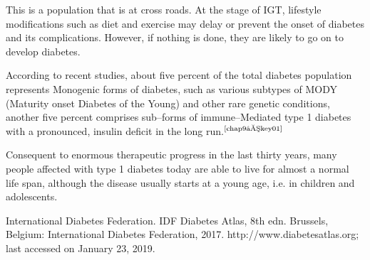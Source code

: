 This is a population that is at cross roads. At the stage of IGT, lifestyle modifications such as diet and exercise may delay or prevent the onset of diabetes and its complications. However, if nothing is done, they are likely to go on to develop diabetes.

According to recent studies, about five percent of the total diabetes population represents Monogenic forms of diabetes, such as various subtypes of MODY (Maturity onset Diabetes of the Young) and other rare genetic conditions, another five percent comprises sub–forms of immune–Mediated type 1 diabetes with a pronounced, insulin deficit in the long run.$^{\text{\cite{chap9–key01}}}$

Consequent to enormous therapeutic progress in the last thirty years, many people affected with type 1 diabetes today are able to live for almost a normal life span, although the disease usually starts at a young age, i.e. in children and adolescents.

\begin{thebibliography}{99}
 International Diabetes Federation. IDF Diabetes Atlas, 8th edn. Brussels, Belgium: International Diabetes Federation, 2017. http://www.diabetesatlas.org; last accessed on January 23, 2019.
 \end{thebibliography}




